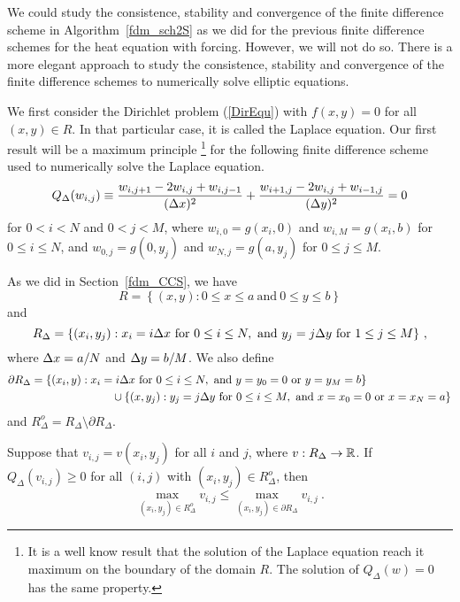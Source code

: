We could study the consistence, stability and convergence of
the finite difference scheme in Algorithm~\ref{fdm_sch2S} as we did
for the previous finite difference schemes for the heat equation
with forcing.  However, we will not do so.  There is a more elegant
approach to study the consistence, stability and convergence of
the finite difference schemes to numerically solve elliptic equations.

We first consider the Dirichlet problem (\ref{DirEqu}) with  
$f(x,y) = 0$ for all $(x,y) \in R$.  In that particular case, it is
called the Laplace equation.  Our first result will be a
maximum principle \footnote{It is a well know result that the solution
of the Laplace equation reach it maximum on the boundary of the
domain $R$.  The solution of $Q_\Delta(w) = 0$ has the same property.}
for the following finite difference scheme used to numerically solve
the Laplace equation.
\[
Q_\Delta(w_{i,j}) \equiv \frac{w_{i,j+1} - 2w_{i,j} + w_{i,j-1}}{(\Delta{x})^2}
+ \frac{w_{i+1,j} - 2w_{i,j} + w_{i-1,j}}{(\Delta{y})^2} = 0
\]
for $0 < i < N$ and $0 < j < M$, where
$w_{i,0} = g(x_i,0)$ and $w_{i,M} = g(x_i,b)$ for $0\leq i \leq N$, and
$w_{0,j} = g(0,y_j)$ and $w_{N,j} = g(a,y_j)$ for $0\leq j \leq M$.

As we did in Section~\ref{fdm_CCS}, we have
\[
  R = \left\{ (x,y) : 0\leq x \leq a \ \text{and} \ 0 \leq y \leq b \right\}
\]
and
\[
R_\Delta = \{ (x_i,y_j) : x_i = i \dtx{x} \ \text{for} \ 0 \leq i \leq N,
\ \text{and} \ y_j = j \dtx{y} \ \text{for} \ 1 \leq j \leq M \} \ ,
\]
where $\Delta{x} = a/N$ and $\Delta{y}=b/M$.  We also define
\begin{align*}
\partial R_\Delta = \{ (x_i,y) : x_i &= i \Delta{x} \ \text{for}
\ 0 \leq i \leq N, \ \text{and} \ y = y_0 = 0 \ \text{or}\ y = y_M = b \} \\
& \quad  \cup
\{ (x,y_j) : y_j = j \Delta{y} \ \text{for} \ 0 \leq i \leq M,
\ \text{and} \ x = x_0 = 0 \ \text{or}\ x = x_N = a \}
\end{align*}
and $R^o_\Delta = R_\Delta \setminus \partial R_\Delta$.

\begin{theorem} \label{LaplaceMaxPrinc}
Suppose that $v_{i,j} = v(x_i,y_j)$ for all $i$ and $j$, where
$v:R_\Delta \to \mathbb{R}$.  If $Q_\Delta(v_{i,j}) \geq 0$ for all $(i,j)$ with
$(x_i,y_j)\in R^o_\Delta$, then
\[
  \max_{(x_i,y_j) \in R^o_\Delta} v_{i,j}
  \leq \max_{(x_i,y_j) \in \partial R_\Delta} v_{i,j} \ .
\]  
\end{theorem}

